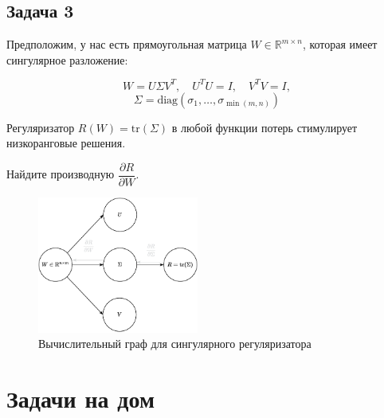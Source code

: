 \documentclass[
  russian,
  letterpaper,
  DIV=11,
  numbers=noendperiod]{scrartcl}
\begin{document}
\subsection{Задача 3}\label{ux437ux430ux434ux430ux447ux430-3}

Предположим, у нас есть прямоугольная матрица
\(W \in \mathbb{R}^{m \times n}\), которая имеет сингулярное разложение:

\hfill\break
\hfill\break

\[
W = U \Sigma V^T, \quad U^TU = I, \quad V^TV = I,
\] \[
\Sigma = \text{diag}(\sigma_1, \ldots, \sigma_{\min(m,n)})
\]

\hfill\break
\hfill\break
Регуляризатор \(R(W) = \text{tr}(\Sigma)\) в любой функции потерь
стимулирует низкоранговые решения.

\begin{tcolorbox}[enhanced jigsaw, colbacktitle=quarto-callout-color!10!white, toptitle=1mm, bottomrule=.15mm, left=2mm, opacitybacktitle=0.6, colframe=quarto-callout-color-frame, arc=.35mm, bottomtitle=1mm, colback=white, coltitle=black, title=\textcolor{quarto-callout-color}{\faInfo}\hspace{0.5em}{Question}, leftrule=.75mm, opacityback=0, rightrule=.15mm, toprule=.15mm, breakable, titlerule=0mm]

Найдите производную \(\dfrac{\partial R}{\partial W}\).

\end{tcolorbox}

\begin{figure}[H]

{\centering \includegraphics[width=2.08333in,height=\textheight,keepaspectratio]{svd_singular_regularizer_comp_graph.pdf}

}

\caption{Вычислительный граф для сингулярного регуляризатора}

\end{figure}%

\section{Задачи на
дом}\label{ux437ux430ux434ux430ux447ux438-ux43dux430-ux434ux43eux43c}
\end{document}
